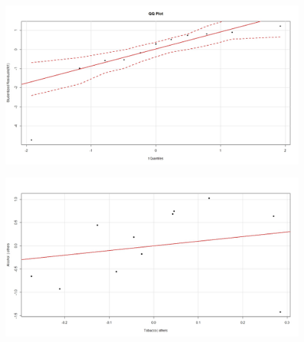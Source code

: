 \documentclass[residuals.tex]{subfiles}
\begin{document}
	\begin{figure}
		\centering
		\includegraphics[width=1.2\linewidth]{alcotob3}
	\end{figure}
	
	
	\begin{figure}
		\centering
		\includegraphics[width=1.2\linewidth]{alcotob4}
	\end{figure}
	
	
	
	
	
\end{document}
